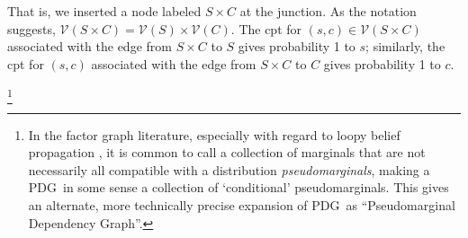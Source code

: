 \documentclass{article}
\newcommand{\vfullfootnote}[1]{}
\renewcommand{\vfullfootnote}[1]{\footnote{#1}}
\newcommand{\V}{\mathcal V}
\newcommand{\MN}{PDG}
\numberwithin{equation}{section}
\begin{document}
\begin{notfocus}
\begin{center}
{}
	\end{center}
That is, we inserted a node labeled $S \times C$ at the junction.  As
the notation suggests, $\V( S \times C) = \V(S) \times \V(C)$.
The cpt for $(s,c) \in \V(S \times C)$  associated with 
the edge from $S \times C$ to $S$ gives probability 1 to $s$;
similarly, the cpt for $(s,c)$  associated with 
the edge from $S \times C$ to $C$ gives probability 1 to $c$.

	
	\vfullfootnote{In the factor graph literature, especially with regard to loopy belief propagation \parencite{wainwright2008graphical}, it is common to call a collection of marginals that are not necessarily all compatible with a distribution \emph{pseudomarginals}, making a \MN\ in some sense a collection of `conditional' pseudomarginals. This gives an alternate, more technically precise expansion of \MN\ as ``Pseudomarginal Dependency Graph''.}




\end{notfocus}
\end{document}
